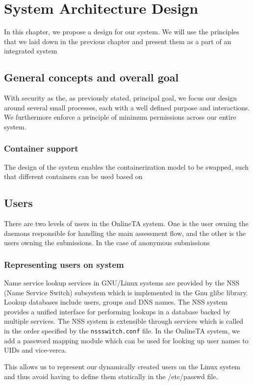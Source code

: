 \chapter{System Architecture Design}
In this chapter, we propose a design for our system. We will use the
principles that we laid down in the previous chapter and present them
as a part of an integrated system

\section{General concepts and overall goal}
With security as the, as previously stated, principal goal, we focus
our design around several small processes, each with a well defined
purpose and interactions. We furthermore enforce a principle of
minimum permissions across our entire system.

\subsection{Container support}
The design of the system enables the containerization model to be
swapped, such that different containers can be used based on


\section{Users}
There are two levels of users in the OnlineTA system. One is the user
owning the daemons responsible for handling the main assessment flow,
and the other is the users owning the submissions. In the case of
anonymous submissions

\subsection{Representing users on system}
Name service lookup services in GNU/Linux systems are provided by the
NSS (Name Service Switch) subsystem which is implemented in the Gnu
glibc library. Lookup databases include users, groups and DNS
names. The NSS system provides a unified interface for performing
lookups in a database backed by multiple services. The NSS system is
extensible through services which is called in the order specified by
the \texttt{nssswitch.conf} file. In the OnlineTA system, we add a
password mapping module which can be used for looking up user names to
UIDs and vice-verca\cite{nss}.

This allows us to represent our dynamically created users on the Linux
system and thus avoid having to define them statically in the
/etc/passwd file.

